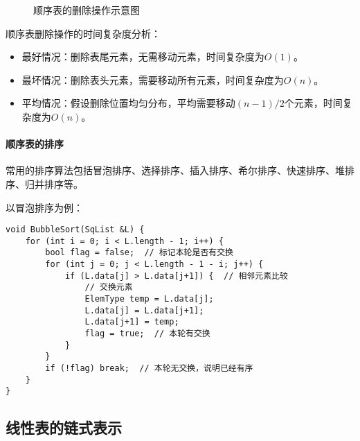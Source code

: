 \documentclass{../../note}
\begin{document}
\begin{figure}[h]
  \centering
  \caption{顺序表的删除操作示意图}
\end{figure}

顺序表删除操作的时间复杂度分析：
\begin{itemize}
  \item 最好情况：删除表尾元素，无需移动元素，时间复杂度为$O(1)$。
  \item 最坏情况：删除表头元素，需要移动所有元素，时间复杂度为$O(n)$。
  \item 平均情况：假设删除位置均匀分布，平均需要移动$(n-1)/2$个元素，时间复杂度为$O(n)$。
\end{itemize}

\paragraph{顺序表的排序}
常用的排序算法包括冒泡排序、选择排序、插入排序、希尔排序、快速排序、堆排序、归并排序等。

以冒泡排序为例：
\begin{verbatim}
void BubbleSort(SqList &L) {
    for (int i = 0; i < L.length - 1; i++) {
        bool flag = false;  // 标记本轮是否有交换
        for (int j = 0; j < L.length - 1 - i; j++) {
            if (L.data[j] > L.data[j+1]) {  // 相邻元素比较
                // 交换元素
                ElemType temp = L.data[j];
                L.data[j] = L.data[j+1];
                L.data[j+1] = temp;
                flag = true;  // 本轮有交换
            }
        }
        if (!flag) break;  // 本轮无交换，说明已经有序
    }
}
\end{verbatim}

\subsection{线性表的链式表示}
\end{document}
